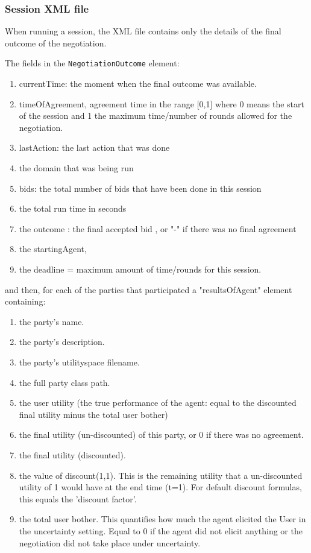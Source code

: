 \documentclass[]{llncs}
\begin{document}
\subsubsection{Session XML file}
When running a session, the XML file contains only the details of the final outcome of the negotiation.

The fields in the \verb|NegotiationOutcome| element:\label{table:NegotiationOutcome}
\begin{enumerate}
\item currentTime: the moment when the final outcome was available. 
\item timeOfAgreement, agreement time in the range [0,1] where 0 means the start of the session and 1 the maximum time/number of rounds allowed for the negotiation. 
\item lastAction: the last action that was done
\item the domain that was being run
\item bids: the total number of bids that have been done in this session
\item the total run time in seconds
\item the outcome : the final accepted bid , or "-" if there was no final agreement
\item the startingAgent,
\item the deadline = maximum amount of time/rounds for this session.
\end{enumerate}

and then, for each of the parties that participated a "resultsOfAgent" element containing:
\begin{enumerate}
\item the party's name. 
\item the party's description.
\item the party's utilityspace filename.
\item the full party class path.
\item the user utility (the true performance of the agent: equal to the discounted final utility minus the total user bother)
\item the final utility (un-discounted) of this party, or 0 if there was no agreement.
\item the final utility (discounted).
\item the value of discount(1,1). This is the remaining utility that a un-discounted utility of 1 would have at the end time (t=1). For default discount formulas, this equals the 'discount factor'.
\item the total user bother. This quantifies how much the agent elicited the User in the uncertainty setting. Equal to 0 if the agent did not elicit anything or the negotiation did not take place under uncertainty.
\end{enumerate}
\end{document}
